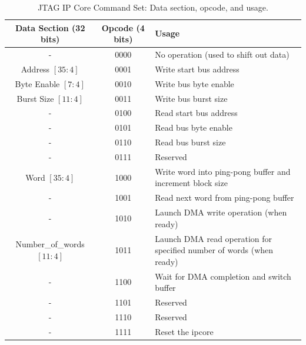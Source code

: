 \documentclass[a4paper,11pt,oneside]{report}
\begin{document}
\begin{table}[h!]
    \centering
    \begin{tabular}{|c|c|l|}
        \hline
        \textbf{Data Section (32 bits)} & \textbf{Opcode (4 bits)} & \textbf{Usage} \\
        \hline
        -                               & 0000                     & No operation (used to shift out data) \\
        Address $[35:4]$                & 0001                     & Write start bus address \\
        Byte Enable $[7:4]$             & 0010                     & Write bus byte enable \\
        Burst Size $[11:4]$             & 0011                     & Write bus burst size \\
        -                               & 0100                     & Read start bus address \\
        -                               & 0101                     & Read bus byte enable \\
        -                               & 0110                     & Read bus burst size \\
        -                               & 0111                     & Reserved \\
        Word $[35:4]$                   & 1000                     & Write word into ping-pong buffer and increment block size \\
        -                               & 1001                     & Read next word from ping-pong buffer \\
        -                               & 1010                     & Launch DMA write operation (when ready) \\
        Number\_of\_words $[11:4]$      & 1011                     & Launch DMA read operation for specified number of words (when ready) \\
        -                               & 1100                     & Wait for DMA completion and switch buffer \\
        -                               & 1101                     & Reserved \\
        -                               & 1110                     & Reserved \\
        -                               & 1111                     & Reset the ipcore \\
        \hline
    \end{tabular}
    \caption{JTAG IP Core Command Set: Data section, opcode, and usage.}

\end{table}
\end{document}
